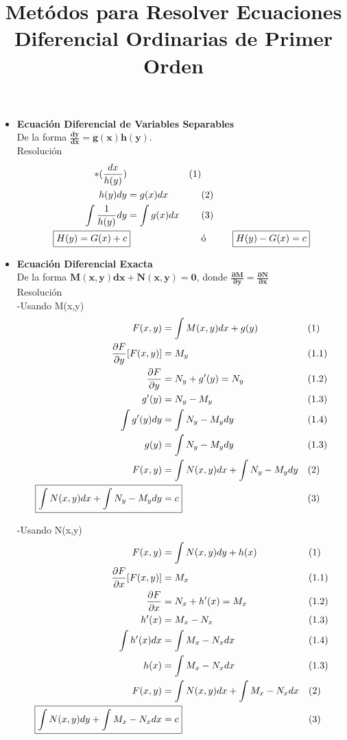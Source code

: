 \documentclass{article}
\title{Metódos para Resolver Ecuaciones Diferencial Ordinarias de Primer Orden}
\begin{document}
\maketitle

\begin{itemize}
    \item \textbf{Ecuación Diferencial de Variables Separables} \\
    De la forma $\boldsymbol{\frac{dy}{dx} = g(x)h(y)}$. \\
    Resolución
    \begin{align*}
        [ \frac{dy}{dx} & = g(x)h(y) ]*(\frac{dx}{h(y)}) &&\text{(1)}\\
        h(y)dy & = g(x)dx &&\text{(2)}\\
        \int \frac{1}{h(y)} dy & = \int g(x)dx &&\text{(3)}\\
        \Aboxed{ H(y) = G(x) + c } &&\text{ó} && \Aboxed{ H(y) - G(x) = c }
    \end{align*}
    
    \item \textbf{Ecuación Diferencial Exacta} \\
    De la forma $\boldsymbol{M(x,y)dx + N(x,y) = 0}$, donde 
    \textbf{$\boldsymbol{\frac{\partial M}{\partial y} = \frac{\partial N}{\partial x}}$} \\
    Resolución \\
    -Usando M(x,y)
    \begin{align*}
        F(x,y) & = \int M(x,y) dx + g(y) &&\text{(1)}\\
        \frac{\partial F}{\partial y}[F(x,y)] & = M_y &&\text{(1.1)}\\
        \frac{\partial F}{\partial y} & = N_y + g'(y) = N_y &&\text{(1.2)}\\
        g'(y) & = N_y - M_y &&\text{(1.3)}\\
        \int g'(y) dy & = \int N_y - M_y dy &&\text{(1.4)}\\
        g(y) & = \int N_y - M_y dy &&\text{(1.3)}\\
        F(x,y) & = \int N(x,y) dx + \int N_y - M_y dy &&\text{(2)}\\
        \Aboxed{ \int N(x,y) dx + \int N_y - M_y dy & = c } &&\text{(3)}
    \end{align*}

    -Usando N(x,y)
    \begin{align*}
        F(x,y) & = \int N(x,y) dy + h(x) &&\text{(1)}\\
        \frac{\partial F}{\partial x}[F(x,y)] & = M_x &&\text{(1.1)}\\
        \frac{\partial F}{\partial x} & = N_x + h'(x) = M_x &&\text{(1.2)}\\
        h'(x) & = M_x - N_x &&\text{(1.3)}\\
        \int h'(x) dx & = \int M_x - N_x dx &&\text{(1.4)}\\
        h(x) & = \int M_x - N_x dx &&\text{(1.3)}\\
        F(x,y) & = \int N(x,y) dx + \int M_x - N_x dx &&\text{(2)}\\
        \Aboxed{ \int N(x,y) dy + \int M_x - N_x dx & = c } &&\text{(3)}
    \end{align*}


\end{itemize}
\end{document}

